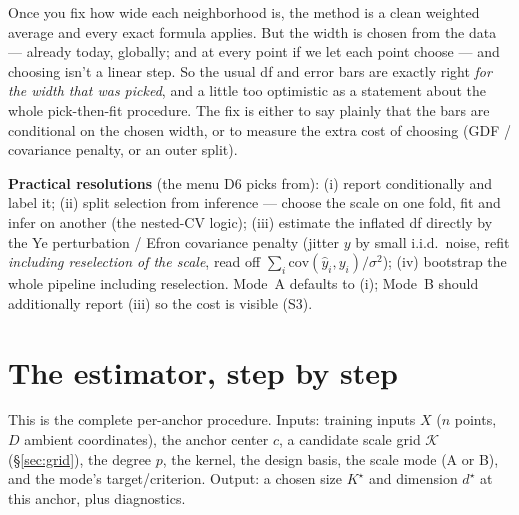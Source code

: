 \documentclass[11pt]{article}
\begin{document}
\begin{plain}
Once you fix how wide each neighborhood is, the method is a clean weighted average and
every exact formula applies. But the width is chosen from the data --- already today,
globally; and at every point if we let each point choose --- and choosing isn't a
linear step. So the usual df and error bars are exactly right \emph{for the width that
was picked}, and a little too optimistic as a statement about the whole pick-then-fit
procedure. The fix is either to say plainly that the bars are conditional on the chosen
width, or to measure the extra cost of choosing (GDF / covariance penalty, or an outer
split).
\end{plain}

\noindent\textbf{Practical resolutions} (the menu D6 picks from): (i) report
conditionally and label it; (ii) split selection from inference --- choose the scale on
one fold, fit and infer on another (the nested-CV logic); (iii) estimate the inflated
df directly by the Ye perturbation / Efron covariance penalty (jitter $y$ by small
i.i.d.\ noise, refit \emph{including reselection of the scale}, read off
$\sum_i\mathrm{cov}(\hat y_i,y_i)/\sigma^2$); (iv) bootstrap the whole pipeline
including reselection. Mode~A defaults to (i); Mode~B should additionally report (iii)
so the cost is visible (S3).

\section{The estimator, step by step}\label{sec:algorithm}

This is the complete per-anchor procedure. Inputs: training inputs $X$ ($n$ points,
$D$ ambient coordinates), the anchor center $c$, a candidate scale grid
$\mathcal{K}$ (\S\ref{sec:grid}), the degree $p$, the kernel, the design basis, the
scale mode (A or B), and the mode's target/criterion. Output: a chosen size $K^\star$
and dimension $d^\star$ at this anchor, plus diagnostics.
\end{document}
